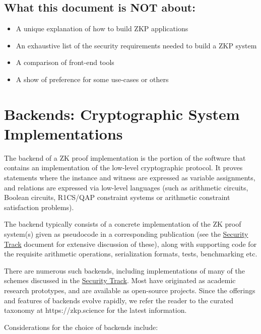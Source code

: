 \subsection{What this document is NOT about:}
\begin{itemize}
 \item A unique explanation of how to build ZKP applications
 \item An exhaustive list of the security requirements needed to build a ZKP system
 \item A comparison of front-end tools
 \item A show of preference for some use-cases or others
\end{itemize}

\section{Backends: Cryptographic System Implementations}
\label{implem:backends}

The backend of a ZK proof implementation is the portion of the software that contains an implementation of the low-level cryptographic protocol. It proves statements where the instance and witness are expressed as variable assignments, and relations are expressed via low-level languages (such as arithmetic circuits, Boolean circuits, R1CS/QAP constraint systems or arithmetic constraint satisfaction problems).

The backend typically consists of a concrete implementation of the ZK proof system(s) given as pseudocode in a corresponding publication (see the \hyperref[chap:track-security]{Security Track} document for extensive discussion of these), along with supporting code for the requisite arithmetic operations, serialization formats, tests, benchmarking etc.

There are numerous such backends, including implementations of many of the schemes discussed in the \hyperref[chap:track-security]{Security Track}. 
Most have originated as academic research prototypes, and are available as open-source projects. 
Since the offerings and features of backends evolve rapidly, we refer the reader to the curated taxonomy at https://zkp.science for the latest information.

Considerations for the choice of backends include:

